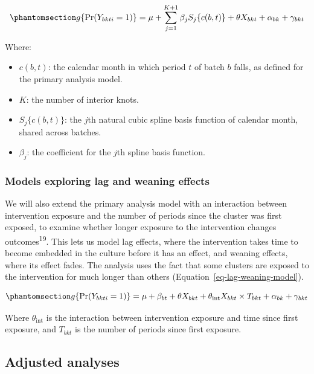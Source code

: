 \documentclass[
]{scrartcl}
\providecommand{\tightlist}{%
  \setlength{\itemsep}{0pt}\setlength{\parskip}{0pt}}\usepackage{longtable,booktabs,array}
\begin{document}
\begin{equation}\phantomsection\label{eq-spline-model}{
g\{\Pr(Y_{bkti} = 1)\}
= \mu + \sum_{j=1}^{K+1} \beta_j S_j\{c(b,t)\} + \theta X_{bkt} + \alpha_{bk} + \gamma_{bkt}
}\end{equation}

Where:

\begin{itemize}
\tightlist
\item
  \(c(b,t)\): the calendar month in which period \(t\) of batch \(b\)
  falls, as defined for the primary analysis model.
\item
  \(K\): the number of interior knots.
\item
  \(S_j\{c(b,t)\}\): the \(j\)th natural cubic spline basis function of
  calendar month, shared across batches.
\item
  \(\beta_j\): the coefficient for the \(j\)th spline basis function.
\end{itemize}

\subsubsection{Models exploring lag and weaning
effects}\label{sec-models-exploring-lag-and-weaning-effects}

We will also extend the primary analysis model with an interaction
between intervention exposure and the number of periods since the
cluster was first exposed, to examine whether longer exposure to the
intervention changes outcomes\textsuperscript{19}. This lets us model
lag effects, where the intervention takes time to become embedded in the
culture before it has an effect, and weaning effects, where its effect
fades. The analysis uses the fact that some clusters are exposed to the
intervention for much longer than others
(Equation~\ref{eq-lag-weaning-model}).

\begin{equation}\phantomsection\label{eq-lag-weaning-model}{
g\{\Pr(Y_{bkti} = 1)\}
= \mu + \beta_{bt} + \theta X_{bkt}
+ \theta_{\text{int}} X_{bkt} \times T_{bkt}
+ \alpha_{bk} + \gamma_{bkt}
}\end{equation}

Where \(\theta_{\text{int}}\) is the interaction between intervention
exposure and time since first exposure, and \(T_{bkt}\) is the number of
periods since first exposure.

\subsection{Adjusted analyses}\label{sec-adjusted-analyses}
\end{document}
